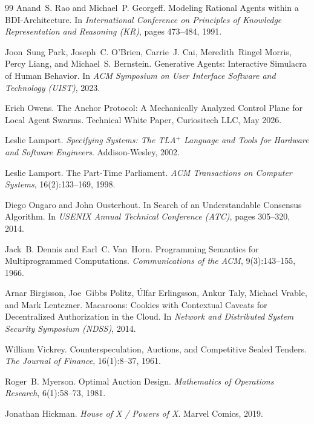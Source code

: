 \documentclass[11pt,a4paper]{article}
\theoremstyle{definition}
\theoremstyle{remark}
\begin{document}
\begin{thebibliography}{99}
Anand~S. Rao and Michael~P. Georgeff.
\newblock Modeling Rational Agents within a BDI-Architecture.
\newblock In \textit{International Conference on Principles of Knowledge Representation and Reasoning (KR)}, pages 473--484, 1991.

Joon~Sung Park, Joseph~C. O'Brien, Carrie~J. Cai, Meredith~Ringel Morris, Percy Liang, and Michael~S. Bernstein.
\newblock Generative Agents: Interactive Simulacra of Human Behavior.
\newblock In \textit{ACM Symposium on User Interface Software and Technology (UIST)}, 2023.

Erich Owens.
\newblock The Anchor Protocol: A Mechanically Analyzed Control Plane for Local Agent Swarms.
\newblock Technical White Paper, Curiositech LLC, May 2026.

Leslie Lamport.
\newblock \textit{Specifying Systems: The TLA$^{+}$ Language and Tools for Hardware and Software Engineers}.
\newblock Addison-Wesley, 2002.

Leslie Lamport.
\newblock The Part-Time Parliament.
\newblock \textit{ACM Transactions on Computer Systems}, 16(2):133--169, 1998.

Diego Ongaro and John Ousterhout.
\newblock In Search of an Understandable Consensus Algorithm.
\newblock In \textit{USENIX Annual Technical Conference (ATC)}, pages 305--320, 2014.

Jack~B. Dennis and Earl~C. Van~Horn.
\newblock Programming Semantics for Multiprogrammed Computations.
\newblock \textit{Communications of the ACM}, 9(3):143--155, 1966.

Arnar Birgisson, Joe~Gibbs Politz, \'{U}lfar Erlingsson, Ankur Taly, Michael Vrable, and Mark Lentczner.
\newblock Macaroons: Cookies with Contextual Caveats for Decentralized Authorization in the Cloud.
\newblock In \textit{Network and Distributed System Security Symposium (NDSS)}, 2014.

William Vickrey.
\newblock Counterspeculation, Auctions, and Competitive Sealed Tenders.
\newblock \textit{The Journal of Finance}, 16(1):8--37, 1961.

Roger~B. Myerson.
\newblock Optimal Auction Design.
\newblock \textit{Mathematics of Operations Research}, 6(1):58--73, 1981.

Jonathan Hickman.
\newblock \textit{House of X / Powers of X}.
\newblock Marvel Comics, 2019.


\end{thebibliography}
\end{document}
